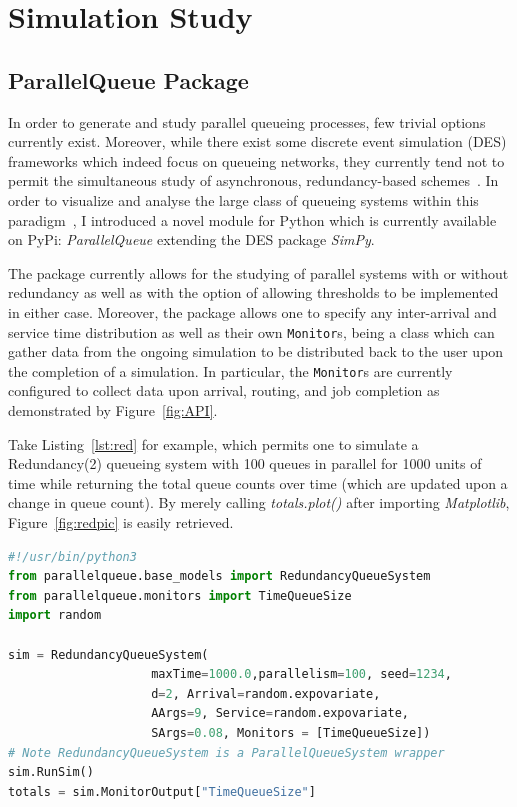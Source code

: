 

\chapter{Simulation Study}\label{ch:simulation-study}


\section{ParallelQueue Package}\label{sec:parallelqueue-package}
In order to generate and study parallel queueing processes, few trivial options currently exist.
Moreover, while there exist some discrete event simulation (DES) frameworks which indeed focus on queueing networks, they currently tend not to permit the simultaneous study of asynchronous, redundancy-based schemes~\cite{noauthor_ciwpythonciw_nodate}.
In order to visualize and analyse the large class of queueing systems within this paradigm~\cite{shneer_large-scale_2020,cruise_stability_2020}, I introduced a novel module for Python which is currently available on PyPi: \textit{ParallelQueue} extending the DES package \textit{SimPy}.

The package currently allows for the studying of parallel systems with or without redundancy as well as with the option of allowing thresholds to be implemented in either case.
Moreover, the package allows one to specify any inter-arrival and service time distribution as well as their own \lstinline{Monitor}s, being a class which can gather data from the ongoing simulation to be distributed back to the user upon the completion of a simulation.
In particular, the \lstinline{Monitor}s are currently configured to collect data upon arrival, routing, and job completion as demonstrated by Figure~\ref{fig:API}.

Take Listing~\ref{lst:red} for example, which permits one to simulate a Redundancy(2) queueing system with 100 queues in parallel for 1000 units of time while returning the total queue counts over time (which are updated upon a change in queue count).
By merely calling \textit{totals.plot()} after importing \textit{Matplotlib}, Figure~\ref{fig:redpic} is easily retrieved.

\begin{lstlisting}[label={lst:red}, caption={Simulation of a redundancy system}, language={Python}, style={mystyle}]
#!/usr/bin/python3
from parallelqueue.base_models import RedundancyQueueSystem
from parallelqueue.monitors import TimeQueueSize
import random

sim = RedundancyQueueSystem(
                    maxTime=1000.0,parallelism=100, seed=1234,
                    d=2, Arrival=random.expovariate,
                    AArgs=9, Service=random.expovariate,
                    SArgs=0.08, Monitors = [TimeQueueSize])
# Note RedundancyQueueSystem is a ParallelQueueSystem wrapper
sim.RunSim()
totals = sim.MonitorOutput["TimeQueueSize"]
\end{lstlisting}

